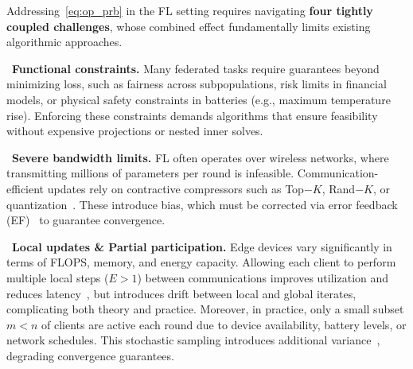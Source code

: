 \documentclass{article} %
\begin{document}
Addressing~\ref{eq:op_prb} in the FL setting requires navigating \textbf{four tightly coupled challenges}, whose combined effect fundamentally limits existing algorithmic approaches.

    \noindent \textbullet\ \textbf{Functional constraints.}  
    Many federated tasks require guarantees beyond minimizing loss, such as fairness across subpopulations, risk limits in financial models, or physical safety constraints in batteries (e.g., maximum temperature rise). Enforcing these constraints demands algorithms that ensure feasibility without expensive projections or nested inner solves.

    \noindent \textbullet\ \textbf{Severe bandwidth limits.}  
    FL often operates over wireless networks, where transmitting millions of parameters per round is infeasible. Communication-efficient updates rely on contractive compressors such as Top$-K$, Rand$-K$, or quantization~\citep{alistarh2017qsgd,stich2019error}. These introduce bias, which must be corrected via {error feedback (EF)}~\citep{stich2019error,fatkhullin2021ef21} to guarantee convergence.

    \noindent \textbullet\ \textbf{Local updates \& Partial participation.}  
    Edge devices vary significantly in terms of FLOPS, memory, and energy capacity. Allowing each client to perform multiple local steps ($ E> 1$) between communications improves utilization and reduces latency~\citep{khaled2019first,li2020federated,li2020federated}, but introduces drift between local and global iterates, complicating both theory and practice. Moreover, in practice, only a small subset $m < n$ of clients are active each round due to device availability, battery levels, or network schedules. This stochastic sampling introduces additional variance~\citep{Li2020On}, degrading convergence guarantees.
\end{document}

